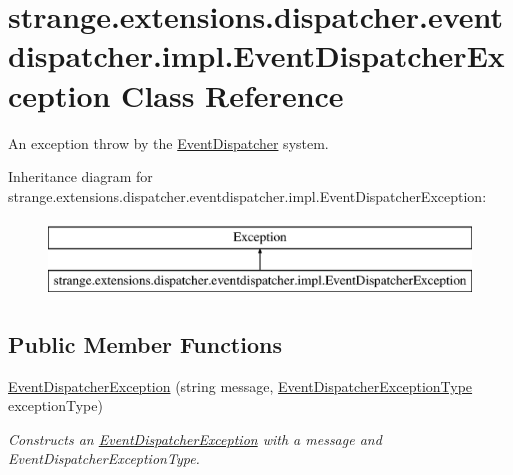 \hypertarget{classstrange_1_1extensions_1_1dispatcher_1_1eventdispatcher_1_1impl_1_1_event_dispatcher_exception}{\section{strange.\-extensions.\-dispatcher.\-eventdispatcher.\-impl.\-Event\-Dispatcher\-Exception Class Reference}
\label{classstrange_1_1extensions_1_1dispatcher_1_1eventdispatcher_1_1impl_1_1_event_dispatcher_exception}
}


An exception throw by the \hyperlink{classstrange_1_1extensions_1_1dispatcher_1_1eventdispatcher_1_1impl_1_1_event_dispatcher}{Event\-Dispatcher} system.  


Inheritance diagram for strange.\-extensions.\-dispatcher.\-eventdispatcher.\-impl.\-Event\-Dispatcher\-Exception\-:\begin{figure}[H]
\begin{center}
\leavevmode
\includegraphics[height=2.000000cm]{classstrange_1_1extensions_1_1dispatcher_1_1eventdispatcher_1_1impl_1_1_event_dispatcher_exception}
\end{center}
\end{figure}
\subsection*{Public Member Functions}
\begin{DoxyCompactItemize}
\item 
\hypertarget{classstrange_1_1extensions_1_1dispatcher_1_1eventdispatcher_1_1impl_1_1_event_dispatcher_exception_acfd736337797e059596dfd8d36616ca1}{\hyperlink{classstrange_1_1extensions_1_1dispatcher_1_1eventdispatcher_1_1impl_1_1_event_dispatcher_exception_acfd736337797e059596dfd8d36616ca1}{Event\-Dispatcher\-Exception} (string message, \hyperlink{namespacestrange_1_1extensions_1_1dispatcher_1_1eventdispatcher_1_1api_ac82e4192fcc43ba5e64f0469a3c7c06d}{Event\-Dispatcher\-Exception\-Type} exception\-Type)}\label{classstrange_1_1extensions_1_1dispatcher_1_1eventdispatcher_1_1impl_1_1_event_dispatcher_exception_acfd736337797e059596dfd8d36616ca1}

\begin{DoxyCompactList}\small\item\em Constructs an \hyperlink{classstrange_1_1extensions_1_1dispatcher_1_1eventdispatcher_1_1impl_1_1_event_dispatcher_exception}{Event\-Dispatcher\-Exception} with a message and Event\-Dispatcher\-Exception\-Type. \end{DoxyCompactList}\end{DoxyCompactItemize}
